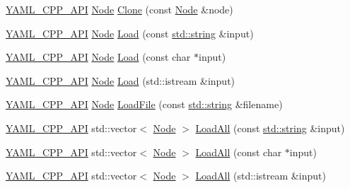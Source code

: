 \begin{DoxyCompactItemize}
\item 
\mbox{\hyperlink{dll_8h_a70903db05b58f40db9aa4f966658fa65}{Y\+A\+M\+L\+\_\+\+C\+P\+P\+\_\+\+A\+PI}} \mbox{\hyperlink{class_y_a_m_l_1_1_node}{Node}} \mbox{\hyperlink{namespace_y_a_m_l_a40aba967a1b8b1eefaa68c08fc9eebdf}{Clone}} (const \mbox{\hyperlink{class_y_a_m_l_1_1_node}{Node}} \&node)
\item 
\mbox{\hyperlink{dll_8h_a70903db05b58f40db9aa4f966658fa65}{Y\+A\+M\+L\+\_\+\+C\+P\+P\+\_\+\+A\+PI}} \mbox{\hyperlink{class_y_a_m_l_1_1_node}{Node}} \mbox{\hyperlink{namespace_y_a_m_l_a45483b10f670351d6065b839b33a8de3}{Load}} (const \mbox{\hyperlink{glad_8h_ac83513893df92266f79a515488701770}{std\+::string}} \&input)
\item 
\mbox{\hyperlink{dll_8h_a70903db05b58f40db9aa4f966658fa65}{Y\+A\+M\+L\+\_\+\+C\+P\+P\+\_\+\+A\+PI}} \mbox{\hyperlink{class_y_a_m_l_1_1_node}{Node}} \mbox{\hyperlink{namespace_y_a_m_l_acd7999f5ac4527cd207e824452a3a08c}{Load}} (const char $\ast$input)
\item 
\mbox{\hyperlink{dll_8h_a70903db05b58f40db9aa4f966658fa65}{Y\+A\+M\+L\+\_\+\+C\+P\+P\+\_\+\+A\+PI}} \mbox{\hyperlink{class_y_a_m_l_1_1_node}{Node}} \mbox{\hyperlink{namespace_y_a_m_l_a56ff264a6b5e45a472ff3141f15fc5d1}{Load}} (std\+::istream \&input)
\item 
\mbox{\hyperlink{dll_8h_a70903db05b58f40db9aa4f966658fa65}{Y\+A\+M\+L\+\_\+\+C\+P\+P\+\_\+\+A\+PI}} \mbox{\hyperlink{class_y_a_m_l_1_1_node}{Node}} \mbox{\hyperlink{namespace_y_a_m_l_a75394f7f2e5ea064ab0fded7bde2677e}{Load\+File}} (const \mbox{\hyperlink{glad_8h_ac83513893df92266f79a515488701770}{std\+::string}} \&filename)
\item 
\mbox{\hyperlink{dll_8h_a70903db05b58f40db9aa4f966658fa65}{Y\+A\+M\+L\+\_\+\+C\+P\+P\+\_\+\+A\+PI}} std\+::vector$<$ \mbox{\hyperlink{class_y_a_m_l_1_1_node}{Node}} $>$ \mbox{\hyperlink{namespace_y_a_m_l_ad8c237adfc2e6f077cef893d9e9f7f9d}{Load\+All}} (const \mbox{\hyperlink{glad_8h_ac83513893df92266f79a515488701770}{std\+::string}} \&input)
\item 
\mbox{\hyperlink{dll_8h_a70903db05b58f40db9aa4f966658fa65}{Y\+A\+M\+L\+\_\+\+C\+P\+P\+\_\+\+A\+PI}} std\+::vector$<$ \mbox{\hyperlink{class_y_a_m_l_1_1_node}{Node}} $>$ \mbox{\hyperlink{namespace_y_a_m_l_aa84968ed9609c1df427baffc554a27ec}{Load\+All}} (const char $\ast$input)
\item 
\mbox{\hyperlink{dll_8h_a70903db05b58f40db9aa4f966658fa65}{Y\+A\+M\+L\+\_\+\+C\+P\+P\+\_\+\+A\+PI}} std\+::vector$<$ \mbox{\hyperlink{class_y_a_m_l_1_1_node}{Node}} $>$ \mbox{\hyperlink{namespace_y_a_m_l_a8fedb8703f6e4a864821f1970455e51b}{Load\+All}} (std\+::istream \&input)

\end{DoxyCompactItemize}
